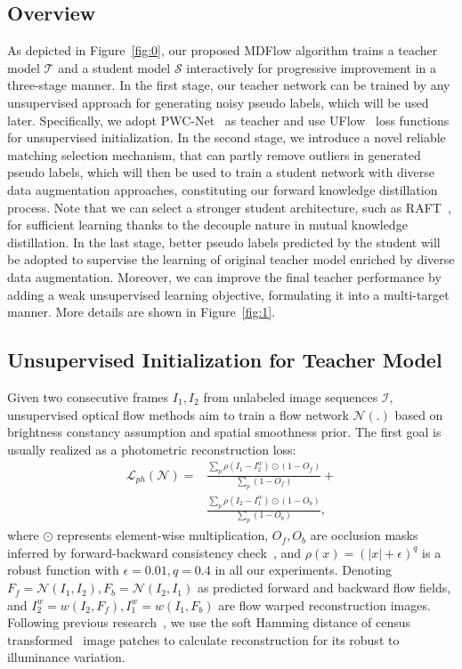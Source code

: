 \documentclass[lettersize,journal]{IEEEtran}
\begin{document}
\subsection{Overview}
As depicted in Figure~\ref{fig:0}, our proposed MDFlow algorithm trains a teacher model $\mathcal{T}$ and a student model $\mathcal{S}$ interactively for progressive improvement in a three-stage manner. In the first stage, our teacher network can be trained by any unsupervised approach for generating noisy pseudo labels, which will be used later. Specifically, we adopt PWC-Net~\cite{8579029} as teacher and use UFlow~\cite{10.1007/978-3-030-58536-5_33} loss functions for unsupervised initialization. In the second stage, we introduce a novel reliable matching selection mechanism, that can partly remove outliers in generated pseudo labels, which will then be used to train a student network with diverse data augmentation approaches, constituting our forward knowledge distillation process. Note that we can select a stronger student architecture, such as RAFT~\cite{teed2020raft}, for sufficient learning thanks to the decouple nature in mutual knowledge distillation. In the last stage, better pseudo labels predicted by the student will be adopted to supervise the learning of original teacher model enriched by diverse data augmentation. Moreover, we can improve the final teacher performance by adding a weak unsupervised learning objective, formulating it into a multi-target manner. More details are shown in Figure~\ref{fig:1}.

\subsection{Unsupervised Initialization for Teacher Model}
Given two consecutive frames $I_1, I_2$ from unlabeled image sequences $\mathcal{I}$, unsupervised optical flow methods aim to train a flow network $\mathcal{N}(.)$ based on brightness constancy assumption and spatial smoothness prior. The first goal is usually realized as a photometric reconstruction loss:
\begin{equation}
	\begin{split}\mathcal{L}_{ph}(\mathcal{N}) = & \frac{\sum_{p}{\rho(I_1-I_2^w)\odot (1-O_f)}}{\sum_{p}{(1-O_f)}}+ \\
		& \frac{\sum_{p}{\rho(I_2-I_1^w)\odot (1-O_b)}}{\sum_{p}{(1-O_b)}},
	\end{split}
	\label{eq:1}
\end{equation}
where $\odot$ represents element-wise multiplication, $O_f, O_b$ are occlusion masks inferred by forward-backward consistency check~\cite{10.1007/978-3-642-15549-9_32,Meister:2018:UUL}, and $\rho(x)=(|x|+\epsilon)^{q}$ is a robust function with $\epsilon=0.01, q=0.4$ in all our experiments. Denoting $F_f = \mathcal{N}(I_1, I_2), F_b = \mathcal{N}(I_2, I_1)$ as predicted forward and backward flow fields, and $I_2^w = \textit{w}(I_2, F_f), I_1^w = \textit{w}(I_1, F_b)$ are flow warped reconstruction images. Following previous research~\cite{Liu:2019:DDFlow,10.1007/978-3-030-58536-5_33}, we use the soft Hamming distance of census transformed~\cite{10.1007/BFb0028345} image patches to calculate reconstruction for its robust to illuminance variation.
\end{document}
